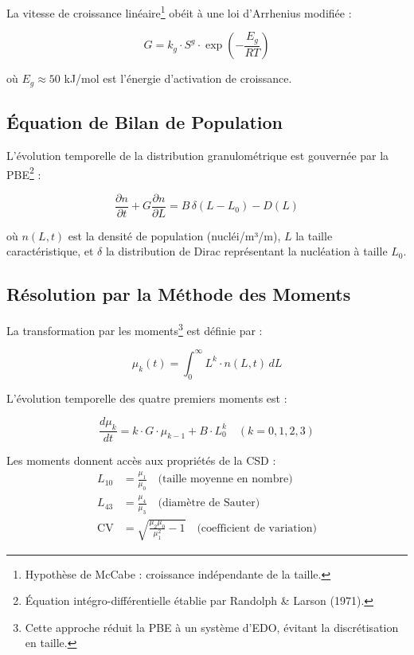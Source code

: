\documentclass[12pt,a4paper,twoside]{article}
\begin{document}
La vitesse de croissance linéaire\footnote{Hypothèse de McCabe : croissance indépendante de la taille.} obéit à une loi d'Arrhenius modifiée :

\begin{equation}
\boxed{G = k_g \cdot S^g \cdot \exp\left(-\frac{E_g}{RT}\right)}
\label{eq:growth}
\end{equation}

où $E_g \approx 50$ kJ/mol est l'énergie d'activation de croissance.

\subsection{Équation de Bilan de Population}

L'évolution temporelle de la distribution granulométrique est gouvernée par la PBE\footnote{Équation intégro-différentielle établie par Randolph \& Larson (1971).} :

\begin{equation}
\boxed{\frac{\partial n}{\partial t} + G \frac{\partial n}{\partial L} = B \, \delta(L - L_0) - D(L)}
\label{eq:pbe}
\end{equation}

où $n(L,t)$ est la densité de population (nucléi/m³/m), $L$ la taille caractéristique, et $\delta$ la distribution de Dirac représentant la nucléation à taille $L_0$.

\subsection{Résolution par la Méthode des Moments}

La transformation par les moments\footnote{Cette approche réduit la PBE à un système d'EDO, évitant la discrétisation en taille.} est définie par :

\begin{equation}
\mu_k(t) = \int_0^{\infty} L^k \cdot n(L,t) \, dL
\label{eq:moment_def}
\end{equation}

L'évolution temporelle des quatre premiers moments est :

\begin{equation}
\boxed{\frac{d\mu_k}{dt} = k \cdot G \cdot \mu_{k-1} + B \cdot L_0^k \quad (k = 0, 1, 2, 3)}
\label{eq:moment_ode}
\end{equation}

Les moments donnent accès aux propriétés de la CSD :
\begin{align}
L_{10} &= \frac{\mu_1}{\mu_0} \quad \text{(taille moyenne en nombre)} \\
L_{43} &= \frac{\mu_4}{\mu_3} \quad \text{(diamètre de Sauter)} \\
\text{CV} &= \sqrt{\frac{\mu_2 \mu_0}{\mu_1^2} - 1} \quad \text{(coefficient de variation)}
\end{align}
\end{document}
